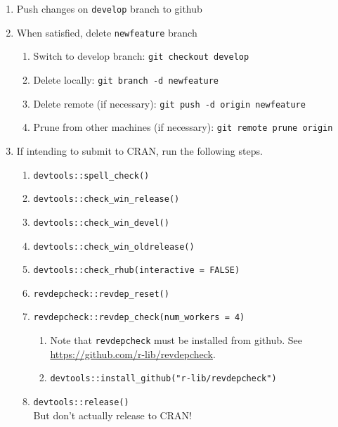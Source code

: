 \documentclass{article}
\begin{document}
\begin{enumerate}
  \item Push changes on \texttt{develop} branch to github
  \item When satisfied, delete \texttt{newfeature} branch
  \begin{enumerate}

    \item Switch to develop branch: \texttt{git checkout develop}

    \item Delete locally: \texttt{git branch -d newfeature}

    \item Delete remote (if necessary): \texttt{git push -d origin newfeature}

	\item Prune from other machines (if necessary): \texttt{git remote prune origin}

  \end{enumerate}

  \item If intending to submit to CRAN,
        run the following steps.

  \begin{enumerate}

    \item \verb+devtools::spell_check()+

	\item \verb+devtools::check_win_release()+

    \item \verb+devtools::check_win_devel()+

	\item \verb+devtools::check_win_oldrelease()+

    \item \verb+devtools::check_rhub(interactive = FALSE)+

    \item \verb+revdepcheck::revdep_reset()+

    \item \verb+revdepcheck::revdep_check(num_workers = 4)+
    \begin{enumerate}

      \item Note that \texttt{revdepcheck} must be installed from github.
            See \url{https://github.com/r-lib/revdepcheck}.

	  \item \verb+devtools::install_github("r-lib/revdepcheck")+

    \end{enumerate}

    \item \verb+devtools::release()+ \\
          But don't actually release to CRAN!

  \end{enumerate}
\end{enumerate}
\end{document}
